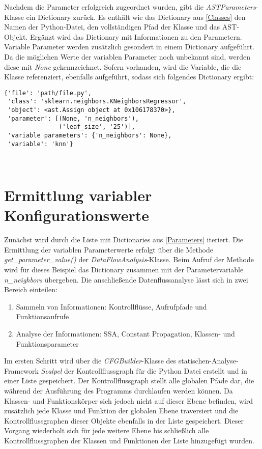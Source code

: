\documentclass[german,bachelor]{swsLeipzig}
\begin{document}
Nachdem die Parameter erfolgreich zugeordnet wurden, gibt die \textit{ASTParameters}-Klasse ein Dictionary zurück.
Es enthält wie das Dictionary aus \ref{Classes} den Namen der Python-Datei, den vollständigen Pfad der Klasse und das AST-Objekt.
Ergänzt wird das Dictionary mit Informationen zu den Parametern.
Variable Parameter werden zusätzlich gesondert in einem Dictionary aufgeführt.
Da die möglichen Werte der variablen Parameter noch unbekannt sind, werden diese mit \textit{None} gekennzeichnet.
Sofern vorhanden, wird die Variable, die die Klasse referenziert, ebenfalls aufgeführt, sodass sich folgendes Dictionary ergibt:\\

\noindent\begin{minipage}{\linewidth}
\begin{lstlisting}[frame=single, label=param_dict, basicstyle=\small, caption={Dictionary-Eintrag der KNeighborsRegressor-Klasse inklusive Parameter},captionpos=b]
{'file': 'path/file.py',
 'class': 'sklearn.neighbors.KNeighborsRegressor',
 'object': <ast.Assign object at 0x106178370>},
 'parameter': [(None, 'n_neighbors'),
               ('leaf_size', '25')],
 'variable parameters': {'n_neighbors': None},
 'variable': 'knn'}
\end{lstlisting}
\end{minipage}
\

\section{Ermittlung variabler Konfigurationswerte}
Zunächst wird durch die Liste mit Dictionaries aus \ref{Parameters} iteriert.
Die Ermittlung der variablen Parameterwerte erfolgt über die Methode \textit{get\_parameter\_value()} der \textit{DataFlowAnalysis}-Klasse.
Beim Aufruf der Methode wird für dieses Beispiel das Dictionary zusammen mit der Parametervariable \textit{n\_neighbors} übergeben.
Die anschließende Datenflussanalyse lässt sich in zwei Bereich einteilen:

\begin{enumerate}
 \item Sammeln von Informationen: Kontrollflüsse, Aufrufpfade und Funktionsaufrufe
 \item Analyse der Informationen: SSA, Constant Propagation, Klassen- und Funktionsparameter
\end{enumerate}

Im ersten Schritt wird über die \textit{CFGBuilder}-Klasse des statischen-Analyse-Framework \textit{Scalpel} der
Kontrollflussgraph für die Python Datei erstellt und in einer Liste gespeichert.
Der Kontrollflussgraph stellt alle globalen Pfade dar, die während der Ausführung des Programms durchlaufen werden können.
Da Klassen- und Funktionskörper sich jedoch nicht auf dieser Ebene befinden, wird zusätzlich jede Klasse und Funktion
der globalen Ebene traversiert und die Kontrollflussgraphen dieser Objekte ebenfalls in der Liste gespeichert.
Dieser Vorgang wiederholt sich für jede weitere Ebene bis schließlich alle Kontrollflussgraphen der
Klassen und Funktionen der Liste hinzugefügt wurden. \\
\end{document}
